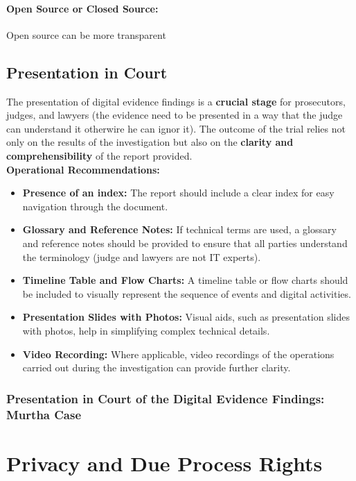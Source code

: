 \paragraph{Open Source or Closed Source:} %
Open source can be more transparent

\subsection{Presentation in Court}

The presentation of digital evidence findings is a \textbf{crucial stage} for prosecutors, judges, and lawyers (the evidence need to be presented in a way that the judge can understand it otherwire he can ignor it). The outcome of the trial relies not only on the results of the investigation but also on the \textbf{clarity and comprehensibility} of the report provided. \\

\textbf{Operational Recommendations:}
\begin{itemize}
  \item \textbf{Presence of an index:} The report should include a clear index for easy navigation through the document.
  \item \textbf{Glossary and Reference Notes:} If technical terms are used, a glossary and reference notes should be provided to ensure that all parties understand the terminology (judge and lawyers are not IT experts).
  \item \textbf{Timeline Table and Flow Charts:} A timeline table or flow charts should be included to visually represent the sequence of events and digital activities.
  \item \textbf{Presentation Slides with Photos:} Visual aids, such as presentation slides with photos, help in simplifying complex technical details.
  \item \textbf{Video Recording:} Where applicable, video recordings of the operations carried out during the investigation can provide further clarity.
\end{itemize}

\subsubsection{Presentation in Court of the Digital Evidence Findings: Murtha Case}


\section{Privacy and Due Process Rights}

